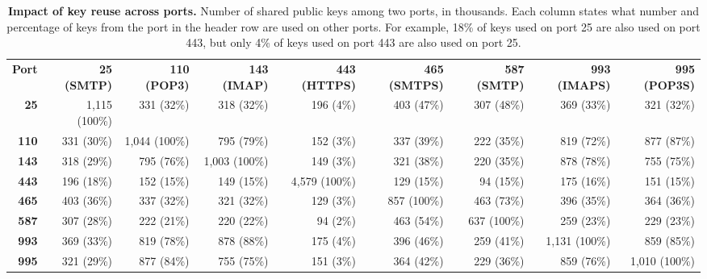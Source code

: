 \begin{table*}[th]
\centering\footnotesize
 \begin{tabular}{rrrrrrrrr} 
\toprule

\textbf{Port} & \textbf{25 (SMTP)} & \textbf{110 (POP3)} & \textbf{143 (IMAP)} & \textbf{443 (HTTPS)} & \textbf{465 (SMTPS)} & \textbf{587 (SMTP)} & \textbf{993 (IMAPS)} & \textbf{995 (POP3S)}\smallskip\\
\textbf{ 25} &  1,115 (100\%) &           331 (32\%) &       318 (32\%) &       196 (4\%) &        403 (47\%) &       307 (48\%) &       369 (33\%) &       321 (32\%) \\
\textbf{110} &    331 (30\%) &         1,044 (100\%) &      795 (79\%) &       152 (3\%) &        337 (39\%) &       222 (35\%) &       819 (72\%) &       877 (87\%) \\
\textbf{143} &    318 (29\%) &           795 (76\%) &     1,003 (100\%) &      149 (3\%) &        321 (38\%) &       220 (35\%) &       878 (78\%) &       755 (75\%) \\
\textbf{443} &    196 (18\%) &           152 (15\%) &       149 (15\%) &     4,579 (100\%) &      129 (15\%) &        94 (15\%) &       175 (16\%) &       151 (15\%) \\
\textbf{465} &    403 (36\%) &           337 (32\%) &       321 (32\%) &       129 (3\%) &        857 (100\%) &      463 (73\%) &       396 (35\%) &       364 (36\%) \\
\textbf{587} &    307 (28\%) &           222 (21\%) &       220 (22\%) &        94 (2\%) &        463 (54\%) &       637 (100\%) &      259 (23\%) &       229 (23\%) \\
\textbf{993} &    369 (33\%) &           819 (78\%) &       878 (88\%) &       175 (4\%) &        396 (46\%) &       259 (41\%) &     1,131 (100\%) &      859 (85\%) \\
\textbf{995} &    321 (29\%) &           877 (84\%) &       755 (75\%) &       151 (3\%) &        364 (42\%) &       229 (36\%) &       859 (76\%) &     1,010 (100\%) \\

\bottomrule
 \end{tabular}
 \caption{\textbf{Impact of key reuse across ports.} Number of shared public keys among two ports, in thousands.
          Each column states what number and percentage of keys from the port in the header row are used on other ports.
          For example, 18\% of keys used on port 25 are also used on port 443, but only 4\% of keys used on port 443 are also used on port 25. }
 \label{amount_shared_keys}
\end{table*}

